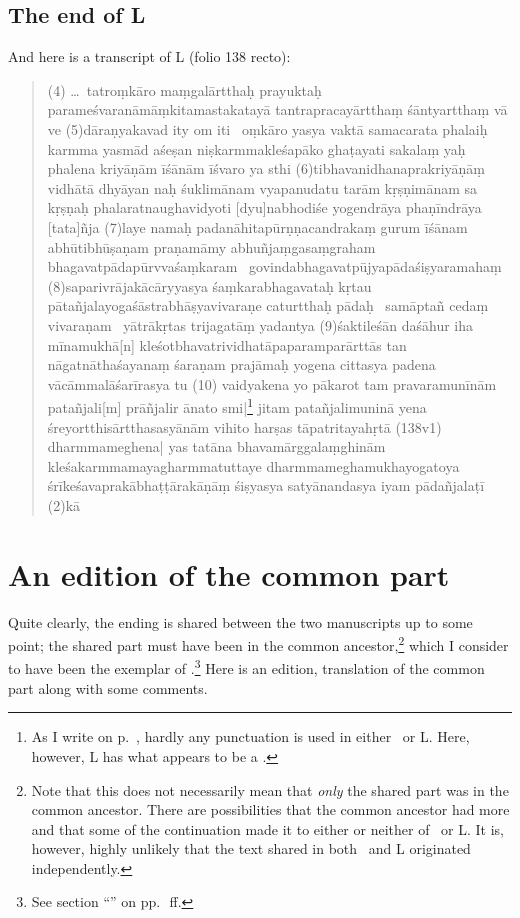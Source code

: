 \subsection{The end of L}
And here is a transcript of L (folio 138 recto):
\begin{quote}
(4) \ldots\ tatroṃkāro maṃgalārtthaḥ prayuktaḥ parame\-śva\-ra\-nā\-mā\-ṃki\-ta\-mastakatayā tantrapracayārtthaṃ śāntyartthaṃ vā ve\-%
(5)\-dā\-ra\-ṇya\-kavad ity om iti \HTG\ oṃkāro yasya vaktā samacarata phalaiḥ karmma yasmād aśeṣan niṣkarmmakleśapāko gha\-ṭa\-ya\-ti sakalaṃ yaḥ phalena kriyāṇām īśānām īśvaro ya sthi\-%
(6)\-ti\-bha\-va\-ni\-dha\-na\-pra\-kri\-yā\-ṇāṃ vi\-dhā\-tā dhyāyan naḥ śuklimānam vyapanudatu tarām kṛṣṇimānam sa kṛṣṇaḥ pha\-la\-ra\-tnau\-gha\-vi\-dyo\-ti [dyu]na\-bho\-di\-śe yogendrāya phaṇīndrāya [tata]ñja\-%
(7)\-la\-ye namaḥ padanāhitapū\-rṇṇa\-ca\-ndra\-kaṃ gurum īśānam abhūtibhūṣaṇam praṇamāmy abhu\-ñja\-ṃga\-saṃ\-gra\-ham bha\-ga\-va\-tpā\-da\-pū\-rvva\-śaṃ\-ka\-ram \HTG\ go\-vi\-nda\-bha\-ga\-va\-tpū\-jya\-pā\-da\-śi\-ṣya\-ra\-ma\-haṃ%
(8)sa\-parivrājakācā\-ryya\-sya śaṃ\-ka\-ra\-bha\-ga\-va\-taḥ kṛtau pā\-ta\-ñja\-la\-yo\-ga\-śā\-stra\-bhā\-ṣya\-vi\-va\-ra\-ṇe ca\-tu\-rttha\-ḥ pādaḥ \HTG\ sa\-mā\-pta\-ñ cedaṃ vivaraṇam \HTG\ yātrākṛtas tri\-ja\-ga\-tāṃ ya\-da\-[ci]\-ntya\-%
(9)\-śa\-kti\-leśān daśāhur iha mīnamukhā[n] kleśo\-t\-bha\-va\-tri\-vi\-dha\-tā\-pa\-pa\-ra\-mparā\-rttās tan nā\-ga\-tnā\-tha\-śa\-ya\-naṃ śa\-ra\-ṇam pra\-jā\-maḥ 
yo\-ge\-na ci\-tta\-sya pa\-de\-na vācāmmalāśarīrasya tu %
(10) vai\-dya\-ke\-na yo pākarot tam pra\ccs vara\cce munīnām pata\-ñja\-li[m] prāñjalir ā\-na\-to smi|\footnote{As I write on p.~\pageref{punctuation}, hardly any punctuation is used in either \Tm\ or L\@. Here, however, L has what appears to be a \danda.} jitam pata\-ñja\-li\-muninā yena śreyo\-rtthi\-sā\-rttha\-sa\-syā\-nām vihito harṣas tā\-pa\-tri\-ta\-ya\-hṛtā %
(138v1) dha\-rmma\-me\-ghe\-na| yas ta\-tā\-na bha\-va\-mārgga\-laṃ\-ghi\-nām kle\-śa\-ka\-rmma\-ma\-ya\-gha\-rmma\-tu\-tta\-ye dha\-rmma\-megha\-mu\-kha\-yogatoya śrī\-ke\-śa\-va\-pra\-kā\-bha\-ṭṭā\-ra\-kā\-ṇāṃ śiṣyasya sa\-tyā\-na\-nda\-sya iya\-m pādañjalaṭī%
(2)kā \HTG\ \HTG\ \HTG
\end{quote}

\section{An edition of the common part}
Quite clearly, the ending is shared between the two manuscripts up to some point; the shared part must have been in the common ancestor,\footnote{Note that this does not necessarily mean that \emph{only} the shared part was in the common ancestor. There are possibilities that the common ancestor had more and that some of the continuation made it to either or neither of \Tm\ or L\@. It is, however, highly unlikely that the text shared in both \Tm\ and L originated independently.} which I consider to have been the exemplar of \Tm.\footnote{See section ``'' on pp.~\pageref{extm}\,ff.}  Here is an edition, translation of the common part along with some comments.

